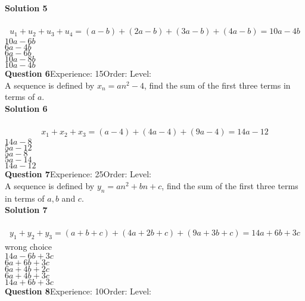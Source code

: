 \documentclass{article}
\begin{document}
\noindent\textbf{Solution 5}\\[2pt]
\\[-10pt]\begin{align*}
u_1+u_2+u_3+u_4=(a-b)+(2a-b)+(3a-b)+(4a-b)=10a-4b
\end{align*}
$10a-6b$\\
$6a-4b$\\
$6a-6b$\\
$10a-8b$\\
$10a-4b$\\
\noindent\textbf{Question 6}\hspace{20pt}Experience: 15\hspace{20pt}Order: \hspace{20pt}Level: \\[2pt]
A sequence is defined by $x_n=an^2-4$, find the sum of the first three terms in terms of $a$.\\[4pt]
\noindent\textbf{Solution 6}\\[2pt]
\\[-10pt]\begin{align*}
x_1+x_2+x_3=(a-4)+(4a-4)+(9a-4)=14a-12
\end{align*}
$14a-8$\\
$5a-12$\\
$5a-8$\\
$5a-14$\\
$14a-12$\\
\noindent\textbf{Question 7}\hspace{20pt}Experience: 25\hspace{20pt}Order: \hspace{20pt}Level: \\[2pt]
A sequence is defined by $y_n=an^2+bn+c$, find the sum of the first three terms in terms of $a,b$ and $c$.\\[4pt]
\noindent\textbf{Solution 7}\\[2pt]
\\[-10pt]\begin{align*}
y_1+y_2+y_3=(a+b+c)+(4a+2b+c)+(9a+3b+c)=14a+6b+3c
\end{align*}
wrong choice\\[4pt]
$14a-6b+3c$\\
$6a+6b+3c$\\
$6a+4b+2c$\\
$6a+4b+3c$\\
$14a+6b+3c$\\
\noindent\textbf{Question 8}\hspace{20pt}Experience: 10\hspace{20pt}Order: \hspace{20pt}Level: \\[2pt]
\end{document}
